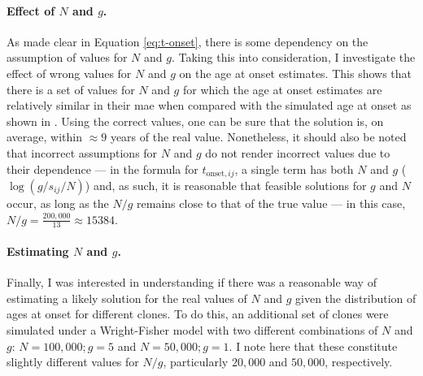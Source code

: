 \paragraph{Effect of $N$ and $g$.} As made clear in Equation \eqref{eq:t-onset}, there is some dependency on the assumption of values for $N$ and $g$. Taking this into consideration, I investigate the effect of wrong values for $N$ and $g$ on the age at onset estimates. This shows that there is a set of values for $N$ and $g$ for which the age at onset estimates are relatively similar in their \ac{mae} when compared with the simulated age at onset as shown in . Using the correct values, one can be sure that the solution is, on average, within $\approx 9$ years of the real value. Nonetheless, it should also be noted that incorrect assumptions for $N$ and $g$ do not render incorrect values due to their dependence --- in the formula for $t_{\mathrm{onset},ij}$, a single term has both $N$ and $g$ ($\log(g/s_{ij}/N)$) and, as such, it is reasonable that feasible solutions for $g$ and $N$ occur, as long as the $N/g$ remains close to that of the true value --- in this case, $N/g = \frac{200,000}{13} \approx 15384$.

\begin{figure}[!ht]
	\label{fig:age-at-onset-mae}
\end{figure}

\paragraph{Estimating $N$ and $g$.} Finally, I was interested in understanding if there was a reasonable way of estimating a likely solution for the real values of $N$ and $g$ given the distribution of ages at onset for different clones. To do this, an additional set of clones were simulated under a Wright-Fisher model with two different combinations of $N$ and $g$: $N=100,000;g=5$ and $N=50,000;g=1$. I note here that these constitute slightly different values for $N/g$, particularly $20,000$ and $50,000$, respectively. 

